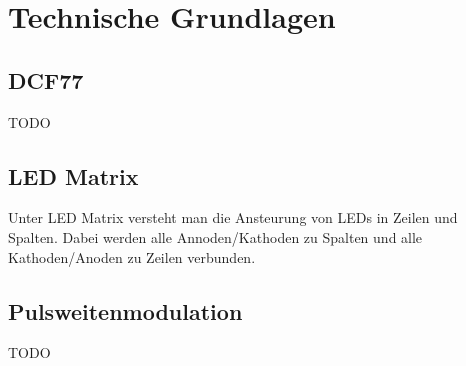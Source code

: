 \section{Technische Grundlagen}
\subsection{DCF77}
TODO

\subsection{LED Matrix}
Unter LED Matrix versteht man die Ansteurung von LEDs in Zeilen und Spalten. Dabei werden alle Annoden/Kathoden zu Spalten und alle Kathoden/Anoden zu Zeilen
verbunden. 

\subsection{Pulsweitenmodulation}\label{sec_pulsweitenmodulation}
TODO